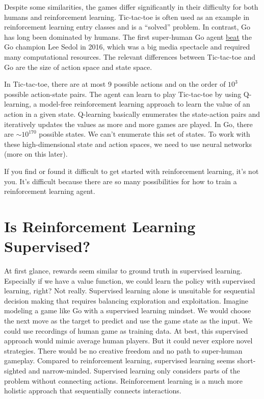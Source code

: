 \documentclass[
  10pt,
]{scrbook}
\begin{document}
Despite some similarities, the games differ significantly in their difficulty for both humans and reinforcement learning.
Tic-tac-toe is often used as an example in reinforcement learning entry classes and is a ``solved'' problem.
In contrast, Go has long been dominated by humans.
The first super-human Go agent \href{https://en.wikipedia.org/wiki/AlphaGo_versus_Lee_Sedol}{beat} the Go champion Lee Sedol in 2016, which was a big media spectacle and required many computational resources.
The relevant differences between Tic-tac-toe and Go are the size of action space and state space.

In Tic-tac-toe, there are at most 9 possible actions and on the order of \(10^3\) possible action-state pairs.
The agent can learn to play Tic-tac-toe by using Q-learning, a model-free reinforcement learning approach to learn the value of an action in a given state.
Q-learning basically enumerates the state-action pairs and iteratively updates the values as more and more games are played.
In Go, there are \(\sim 10^{170}\) possible states.
We can't enumerate this set of states.
To work with these high-dimensional state and action spaces, we need to use neural networks (more on this later).

If you find or found it difficult to get started with reinforcement learning, it's not you.
It's difficult because there are so many possibilities for how to train a reinforcement learning agent.

\hypertarget{is-reinforcement-learning-supervised}{%
\section{Is Reinforcement Learning Supervised?}\label{is-reinforcement-learning-supervised}}

At first glance, rewards seem similar to ground truth in supervised learning.
Especially if we have a value function, we could learn the policy with supervised learning, right?
Not really.
Supervised learning alone is unsuitable for sequential decision making that requires balancing exploration and exploitation.
Imagine modeling a game like Go with a supervised learning mindset.
We would choose the next move as the target to predict and use the game state as the input.
We could use recordings of human game as training data.
At best, this supervised approach would mimic average human players.
But it could never explore novel strategies.
There would be no creative freedom and no path to super-human gameplay.
Compared to reinforcement learning, supervised learning seems short-sighted and narrow-minded.
Supervised learning only considers parts of the problem without connecting actions.
Reinforcement learning is a much more holistic approach that sequentially connects interactions.
\end{document}
